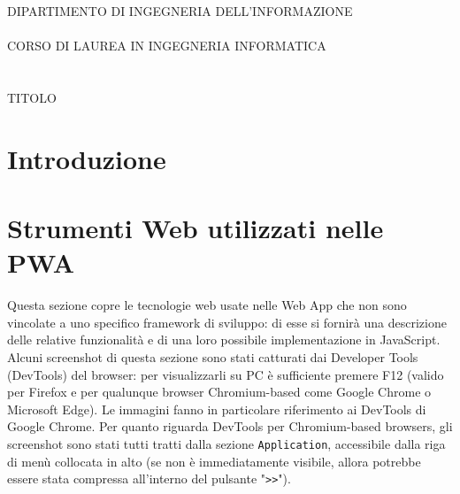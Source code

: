 \documentclass[a4paper, 12pt, twoside, openright]{book}
\newenvironment{abstract}{\cleardoublepage \null \vfill \begin{center}\bfseries\abstractname \end{center}}{\vfill\null}
\begin{document}
\frontmatter
\begin{titlepage}
	\begin{flushleft}
		
		\begin{minipage}[b][1,8 cm][c]{0.3\columnwidth}
			\textsf{{\color{Sepia}{DIPARTIMENTO\\DI INGEGNERIA\\DELL'INFORMAZIONE}}}
		\end{minipage}
	\end{flushleft}
	
	\vfill
	\begin{center}
		\begin{large}
			DIPARTIMENTO DI INGEGNERIA DELL'INFORMAZIONE
			\\~\\
			CORSO DI LAUREA IN INGEGNERIA INFORMATICA
			\\~\\~\\
			TITOLO
		\end{large}
	\end{center}
\end{titlepage}
\cleardoublepage %

\begingroup %
  \makeatletter
  \let\ps@plain\ps@empty
  \makeatother
  \tableofcontents
  \clearpage
\endgroup


\begin{abstract} %
\markboth{}{} %
\thispagestyle{empty}
\end{abstract}


\mainmatter\doublespace 

\chapter*{Introduzione} %
\thispagestyle{empty}

\chapter{Strumenti Web utilizzati nelle PWA}
Questa sezione copre le tecnologie web usate nelle Web App che non sono vincolate a uno specifico framework di sviluppo: di esse si fornirà una descrizione delle relative funzionalità e di una loro possibile implementazione in JavaScript.\\
Alcuni screenshot di questa sezione sono stati catturati dai Developer Tools (DevTools) del browser: per visualizzarli su PC è sufficiente premere F12 (valido per Firefox e per qualunque browser Chromium-based come Google Chrome o Microsoft Edge). Le immagini fanno in particolare riferimento ai DevTools di Google Chrome. Per quanto riguarda DevTools per Chromium-based browsers, gli screenshot sono stati tutti tratti dalla sezione \texttt{Application}, accessibile dalla riga di menù collocata in alto (se non è immediatamente visibile, allora potrebbe essere stata compressa all'interno del pulsante "\texttt{>>}"). 
\end{document}
